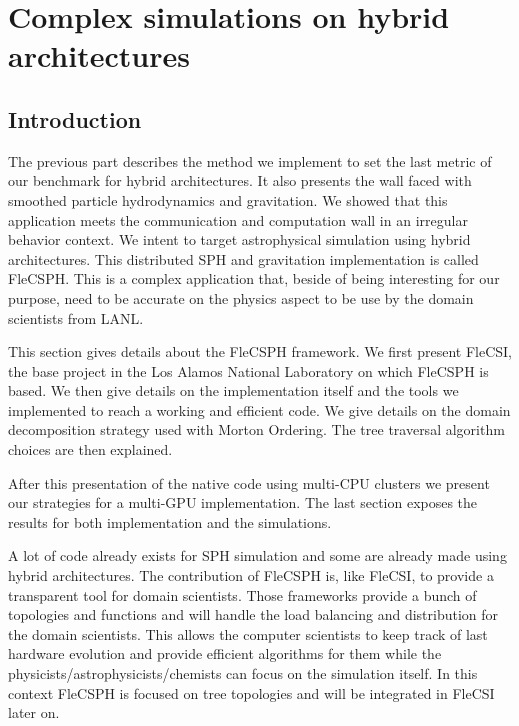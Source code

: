 \chapter{Complex simulations on hybrid architectures}

\section{Introduction}

The previous part describes the method we implement to set the last metric of our benchmark for hybrid architectures.
It also presents the wall faced with smoothed particle hydrodynamics and gravitation. 
We showed that this application meets the communication and computation wall in an irregular behavior context. 
We intent to target astrophysical simulation using hybrid architectures. 
This distributed SPH and gravitation implementation is called FleCSPH. 
This is a complex application that, beside of being interesting for our purpose, need to be accurate on the physics aspect to be use by the domain scientists from LANL. 

This section gives details about the FleCSPH framework. 
We first present FleCSI, the base project in the Los Alamos National Laboratory on which FleCSPH is based. 
We then give details on the implementation itself and the tools we implemented to reach a working and efficient code. 
We give details on the domain decomposition strategy used with Morton Ordering. 
The tree traversal algorithm choices are then explained. 

After this presentation of the native code using multi-CPU clusters we present our strategies for a multi-GPU implementation. 
The last section exposes the results for both implementation and the simulations. 

A lot of code already exists for SPH simulation and some are already made using hybrid architectures.
The contribution of FleCSPH is, like FleCSI, to provide a transparent tool for domain scientists. 
Those frameworks provide a bunch of topologies and functions and will handle the load balancing and distribution for the domain scientists. 
This allows the computer scientists to keep track of last hardware evolution and provide efficient algorithms for them while the physicists/astrophysicists/chemists can focus on the simulation itself. 
In this context FleCSPH is focused on tree topologies and will be integrated in FleCSI later on. 

